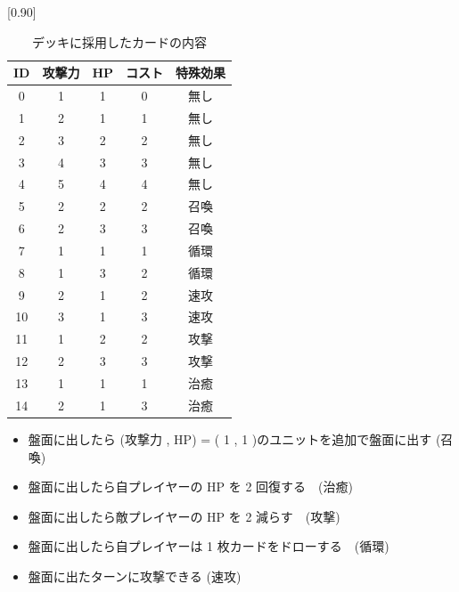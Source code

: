 \documentclass[twocolumn]{jarticle}
\begin{document}
\begin{table}[t]
  \centering
  \small
  \caption{デッキに採用したカードの内容}
  \label{table:deck}
  \vspace{-0.3cm}
  \scalebox{0.90}[0.90]{
    \begin{tabular}{|c|c|c|c|c|}
      \hline
      ID & 攻撃力 & HP & コスト & 特殊効果 \\ \hline
      0 & 1 & 1 & 0 & 無し \\ \hline
      1 & 2 & 1 & 1 & 無し \\ \hline
      2 & 3 & 2 & 2 & 無し \\ \hline
      3 & 4 & 3 & 3 & 無し \\ \hline
      4 & 5 & 4 & 4 & 無し \\ \hline
      5 & 2 & 2 & 2 & 召喚 \\ \hline
      6 & 2 & 3 & 3 & 召喚 \\ \hline
      7 & 1 & 1 & 1 & 循環 \\ \hline
      8 & 1 & 3 & 2 & 循環 \\ \hline
      9 & 2 & 1 & 2 & 速攻 \\ \hline
      10 & 3 & 1 & 3 & 速攻 \\ \hline
      11 & 1 & 2 & 2 & 攻撃 \\ \hline
      12 & 2 & 3 & 3 & 攻撃 \\ \hline
      13 & 1 & 1 & 1 & 治癒 \\ \hline
      14 & 2 & 1 & 3 & 治癒 \\ \hline
      \end{tabular}
  }
  
\end{table}

  \begin{itemize}
  \small
  
  \setlength{\itemsep}{0cm} %
   \item 盤面に出したら (攻撃力 , HP) = ( 1 , 1 )のユニットを追加で盤面に出す (召喚)
   \item 盤面に出したら自プレイヤーの HP を 2 回復する　(治癒)
   \item 盤面に出したら敵プレイヤーの HP を 2 減らす　(攻撃)
   \item 盤面に出したら自プレイヤーは 1 枚カードをドローする　(循環)
   \item 盤面に出たターンに攻撃できる (速攻)
  \end{itemize}
\end{document}
